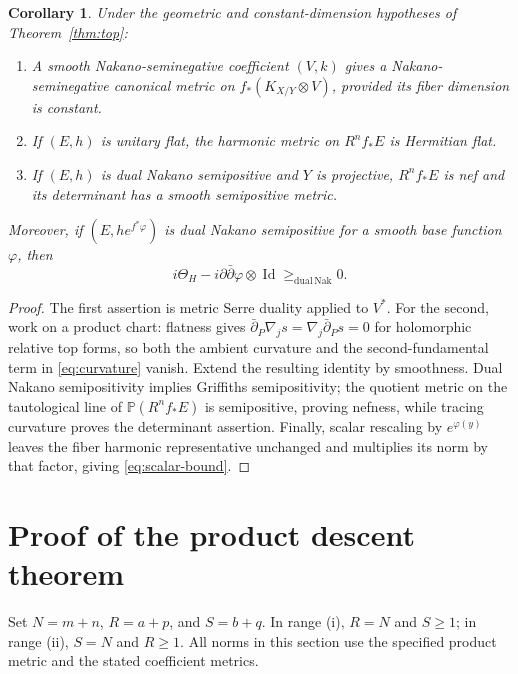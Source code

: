 \documentclass[11pt,reqno]{amsart}
\numberwithin{equation}{section}
\newtheorem{corollary}[theorem]{Corollary}
\theoremstyle{definition}
\theoremstyle{remark}
\newcommand{\ddbar}{\partial\bar\partial}
\newcommand{\db}{\bar\partial}
\newcommand{\Id}{\operatorname{Id}}
\newcommand{\dNak}{\mathrm{dual\,Nak}}
\begin{document}
\begin{corollary}\label{cor:consequences}
Under the geometric and constant-dimension hypotheses of Theorem~\ref{thm:top}:
\begin{enumerate}
\item A smooth Nakano-seminegative coefficient $(V,k)$ gives a Nakano-seminegative canonical metric on $f_*(K_{X/Y}\otimes V)$, provided its fiber dimension is constant.
\item If $(E,h)$ is unitary flat, the harmonic metric on $R^nf_*E$ is Hermitian flat.
\item If $(E,h)$ is dual Nakano semipositive and $Y$ is projective, $R^nf_*E$ is nef and its determinant has a smooth semipositive metric.
\end{enumerate}
Moreover, if $(E,he^{f^*\varphi})$ is dual Nakano semipositive for a smooth base function $\varphi$, then
\begin{equation}\label{eq:scalar-bound}
 i\Theta_H-i\ddbar\varphi\otimes\Id\geq_{\dNak}0.
\end{equation}
\end{corollary}
\begin{proof}
The first assertion is metric Serre duality applied to $V^*$. For the second, work on a product chart: flatness gives $\db_P\nabla_js=\nabla_j\db_Ps=0$ for holomorphic relative top forms, so both the ambient curvature and the second-fundamental term in \eqref{eq:curvature} vanish. Extend the resulting identity by smoothness. Dual Nakano semipositivity implies Griffiths semipositivity; the quotient metric on the tautological line of $\mathbb P(R^nf_*E)$ is semipositive, proving nefness, while tracing curvature proves the determinant assertion. Finally, scalar rescaling by $e^{\varphi(y)}$ leaves the fiber harmonic representative unchanged and multiplies its norm by that factor, giving \eqref{eq:scalar-bound}.
\end{proof}

\section{Proof of the product descent theorem}\label{sec:product-proof}
Set $N=m+n$, $R=a+p$, and $S=b+q$. In range (i), $R=N$ and $S\geq1$; in range (ii), $S=N$ and $R\geq1$. All norms in this section use the specified product metric and the stated coefficient metrics.
\end{document}
